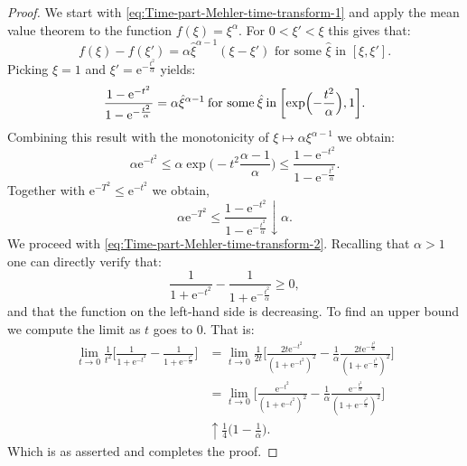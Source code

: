 \documentclass[a4paper,oneside,10pt]{amsproc}
\theoremstyle{plain}
\theoremstyle{remark}
\theoremstyle{definition}
\renewcommand{\leq}{\leqslant}
\renewcommand{\leq}{\leqslant}
\renewcommand{\geq}{\geqslant}
\newcommand{\e}{\mathrm{e}} %
\renewcommand{\leq}{\leqslant}%
\renewcommand{\geq}{\geqslant}%
\begin{document}
\begin{proof}
  We start with \eqref{eq:Time-part-Mehler-time-transform-1} and apply
  the mean value theorem to the function $f(\xi) = \xi^\alpha$. For $0
  < \xi' < \xi$ this gives that:
  \begin{equation*}
    f(\xi) - f(\xi') = \alpha \hat{\xi}^{\alpha - 1} (\xi - \xi')
    \text{ for some $\hat \xi$ in $[\xi, \xi']$}.
  \end{equation*}
  Picking $\xi = 1$ and $\xi' = \e^{-\frac{t^2}{\alpha}}$ yields:
  \begin{equation}
    \label{eq:Time-part-Mehler-time-transform-proof-1}
    \frac{1 - \e^{-t^2}}{1 - \e^{-\frac{t^2}{\alpha}}} = \alpha
    \hat{\xi}^{\alpha - 1} \:\text{for some}\: \hat{\xi} \:\text{in}\:
    \biggl[\exp \Bigl(-\frac{t^2}{\alpha} \Bigr), 1 \biggr].
  \end{equation}
  Combining this result with the monotonicity of $\xi \mapsto
  \alpha \xi^{\alpha - 1}$ we obtain:
  \begin{equation*}
    \alpha \e^{-t^2} \leq \alpha \exp\biggl(-t^2 \frac{\alpha -
      1}{\alpha} \biggr) \leq \frac{1 - \e^{-t^2}}{1 -
      \e^{-\frac{t^2}{\alpha}}}.
  \end{equation*}
  Together with $\e^{-T^2} \leq \e^{-t^2}$ we obtain,
  \begin{equation*}
   \alpha \e^{-T^2} \leq \frac{1 - \e^{-t^2}}{1 -
     \e^{-\frac{t^2}{\alpha}}} \downarrow \alpha.
  \end{equation*}
  We proceed with \eqref{eq:Time-part-Mehler-time-transform-2}.
  Recalling that $\alpha > 1$ one can directly verify that:
  \begin{equation*}
    \frac{1}{1 + \e^{-t^2}} - \frac{1}{1 + \e^{-\frac{t^2}{\alpha}}}
    \geq 0,
  \end{equation*}
  and that the function on the left-hand side is decreasing. To find
  an upper bound we compute the limit as $t$ goes to $0$. That is:
  \begin{align*}
    \lim_{t \to 0} \frac1{t^2}\biggl[\frac{1}{1 +
      \e^{-t^2}} - \frac{1}{1 + \e^{-\frac{t^2}{\alpha}}} \biggr] 
    &= \lim_{t \to 0} \frac1{2t} \biggl[\frac{2t \e^{-t^2}}{(1 +
      \e^{-t^2})^2} - \frac1\alpha \frac{2t
      \e^{-\frac{t^2}{\alpha}}}{(1 + \e^{-\frac{t^2}{\alpha}})^2}
    \biggr]\\ 
    &= \lim_{t \to 0} \biggl[\frac{\e^{-t^2}}{(1 + \e^{-t^2})^2} -
    \frac1\alpha \frac{\e^{-\frac{t^2}{\alpha}}}{(1 +
      \e^{-\frac{t^2}{\alpha}})^2} \biggr]\\
    &\uparrow \frac{1}{4} \biggl(1 - \frac1\alpha \biggr).
  \end{align*}
  Which is as asserted and completes the proof.
\end{proof}
\end{document}
